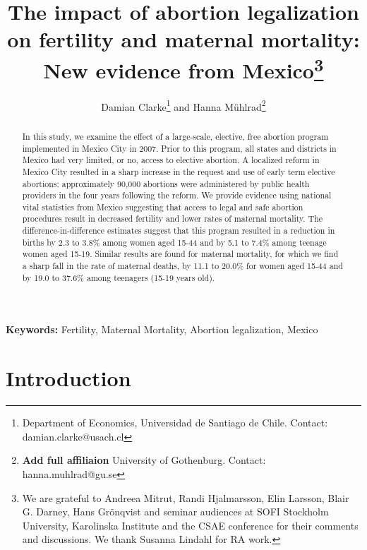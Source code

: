 \documentclass[a4paper, 11pt]{article}
\title{The impact of abortion legalization on fertility and maternal mortality: New evidence from Mexico\thanks{We are grateful to Andreea Mitrut, Randi Hjalmarsson, Elin Larsson, Blair G. Darney, Hans Gr\"onqvist and seminar audiences at SOFI Stockholm University, Karolinska Institute and the CSAE conference for their comments and discussions.  We thank Susanna Lindahl for RA work.}}
\author{Damian Clarke\thanks{Department of Economics, Universidad de Santiago de Chile.  Contact: damian.clarke@usach.cl} and Hanna Mühlrad\thanks{\textbf{Add full affiliaion} University of Gothenburg. Contact: hanna.muhlrad@gu.se}}
\begin{document}
\maketitle
\newpage

\begin{spacing}{2}
\begin{abstract}
\noindent In this study, we examine the effect of a large-scale, elective, free abortion program implemented in Mexico City in 2007. Prior to this program, all states and districts in Mexico had very limited, or no, access to elective abortion. A localized reform in Mexico City resulted in a sharp increase in the request and use of early term elective abortions: approximately 90,000 abortions were administered by public health providers in the four years following the reform. We provide evidence using national vital statistics from Mexico suggesting that access to legal and safe abortion procedures result in decreased fertility and lower rates of maternal mortality. The difference-in-difference estimates suggest that this program resulted in a reduction in births by 2.3 to 3.8\% among women aged 15-44 and by 5.1 to 7.4\% among teenage women aged 15-19. Similar results are found for maternal mortality, for which we find a sharp fall in the rate of maternal deaths, by 11.1 to 20.0\% for women aged 15-44 and by 19.0 to 37.6\% among teenagers (15-19 years old).  
\end{abstract}

\smallskip \noindent \hspace{7mm} \textbf{Keywords:} Fertility, Maternal Mortality, Abortion legalization, Mexico


\newpage 
\section{Introduction}



\end{spacing}
\end{document}
